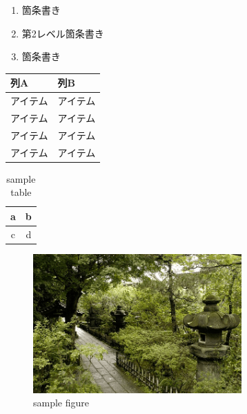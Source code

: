 \begin{enumerate}
\def\labelenumi{\arabic{enumi}.}
\tightlist
\item
  箇条書き
\item
  第2レベル箇条書き
\item
  箇条書き
\end{enumerate}

\begin{longtable}[]{@{}ll@{}}
\toprule
列A & 列B\tabularnewline
\midrule
\endhead
アイテム & アイテム\tabularnewline
アイテム & アイテム\tabularnewline
アイテム & アイテム\tabularnewline
アイテム & アイテム\tabularnewline
\bottomrule
\end{longtable}

\begin{table}[H]
\centering
\caption{sample table \label{tab:ta}}
\begin{tabular}{|c|c|} \hline
a & b \\ \hline
c & d \\ \hline
\end{tabular}
\end{table}

\begin{figure}[H]
\centering
\includegraphics[width=8cm]{./sample/1.png}
\caption{sample figure \label{fig:fi}}
\end{figure}

